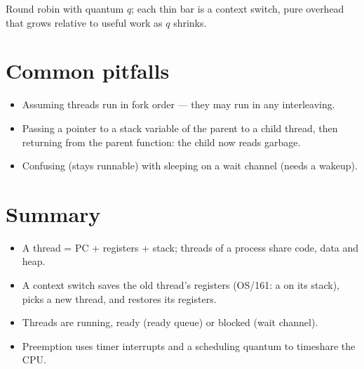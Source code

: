 \begin{center}
\end{center}
Round robin with quantum $q$; each thin bar is a context switch, pure
overhead that grows relative to useful work as $q$ shrinks.

\section{Common pitfalls}
\begin{itemize}
  \item Assuming threads run in fork order --- they may run in any interleaving.
  \item Passing a pointer to a stack variable of the parent to a child thread, then returning
    from the parent function: the child now reads garbage.
  \item Confusing  (stays runnable) with sleeping on a wait channel (needs
    a wakeup).
\end{itemize}

\section*{Summary}
\begin{itemize}
  \item A thread = PC + registers + stack; threads of a process share code, data and heap.
  \item A context switch saves the old thread's registers (OS/161: a  on its
    stack), picks a new thread, and restores its registers.
  \item Threads are running, ready (ready queue) or blocked (wait channel).
  \item Preemption uses timer interrupts and a scheduling quantum to timeshare the CPU.
\end{itemize}
